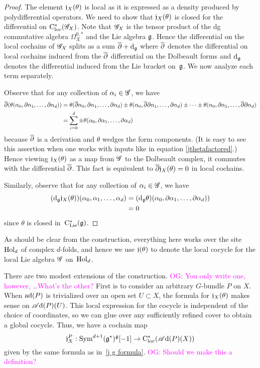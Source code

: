 \documentclass[10pt]{amsart}
\def\sAd{\sA{\rm d}}
\def\owen{\textcolor{magenta}{OG: }\textcolor{magenta}}
\begin{document}
\begin{proof} 
The element $\mathfrak j_X(\theta)$ is local as it is expressed as a density produced by polydifferential operators.
We need to show that $\mathfrak j_X(\theta)$ is closed for the differential on ${\rm C}_{\rm loc}^*(\mathscr G_X)$. 
Note that $\mathscr G_X$ is the tensor product of the dg commutative algebra $\Omega^{0,*}_X$ and the Lie algebra $\mathfrak g$.
Hence the differential on the local cochains of $\mathscr G_X$ splits as a sum $\overline{\partial} + {\rm d}_{\mathfrak g}$ where $\overline{\partial}$ denotes the differential on local cochains induced from the $\overline{\partial}$ differential on the Dolbeault forms and ${\rm d}_{\mathfrak g}$ denotes the differential induced from the Lie bracket on~$\mathfrak g$. 
We now analyze each term separately.

Observe that for any collection of $\alpha_i \in \mathscr G$, we have
\begin{align*}
\overline{\partial}(\theta(\alpha_0,\partial \alpha_1,\ldots,\partial \alpha_d)) 
&= \theta(\overline{\partial}\alpha_0,\partial \alpha_1,\ldots,\partial \alpha_d) \pm \theta(\alpha_0,\overline{\partial} \partial \alpha_1,\ldots,\partial \alpha_d) \pm \cdots \pm \theta(\alpha_0,\partial \alpha_1,\ldots,\overline{\partial}\partial \alpha_d)\\
&= \sum_{i = 0}^d \pm \theta(\alpha_0,\partial \alpha_1,\ldots,\partial \alpha_d)
\end{align*}
because $\overline{\partial}$ is a derivation and $\theta$ wedges the form components.
(It is easy to see this assertion when one works with inputs like in equation \eqref{jthetafactored}.)
Hence viewing $\mathfrak j_X(\theta)$ as a map from $\mathscr G$ to the Dolbeault complex, 
it commutes with the differential $\overline{\partial}$.
This fact is equivalent to $\overline{\partial} \mathfrak j_X(\theta) = 0$ in local cochains.

Similarly, observe that for any collection of $\alpha_i \in \mathscr G$, we have
\begin{align*}
({\rm d}_\mathfrak g \mathfrak j_X(\theta))(\alpha_0, \alpha_1,\ldots, \alpha_d)
&= ({\rm d}_\mathfrak g\theta)(\alpha_0,\partial \alpha_1,\ldots,\partial \alpha_d)) \\
&= 0
\end{align*}
since $\theta$ is closed in~${\rm C}_{\rm Lie}^*(\mathfrak g)$.
\end{proof}

As should be clear from the construction, everything here works over the site ${\rm Hol}_d$ of complex $d$-folds, and hence we use $\mathfrak j(\theta)$ to denote the local cocycle for the local Lie algebra $\mathscr G$ on~${\rm Hol}_d$.

There are two modest extensions of the construction. 
\owen{You only write one, however, \dots What's the other?}
First is to consider an arbitrary $G$-bundle $P$ on $X$. 
When ${\rm ad}(P)$ is trivialized over an open set $U \subset X$,
the formula for $\mathfrak j_X(\theta)$ makes sense on $\sAd(P)(U)$.
This local expression for the cocycle is independent of the choice of coordinates,
so we can glue over any sufficiently refined cover to obtain a global cocycle. 
Thus, we have a cochain map
\[
\fj_X^P : \Sym^{d+1} (\fg^*)^\fg [-1] \to \cloc^*(\sAd(P)(X))
\]
given by the same formula as in~\eqref{j g formula}.
\owen{Should we make this a definition?}
\end{document}
